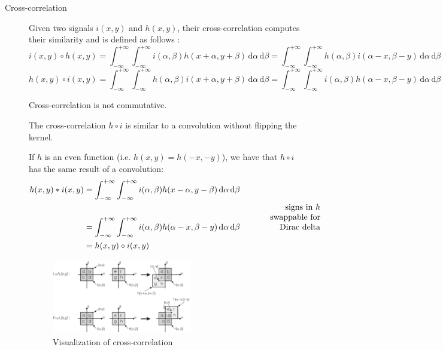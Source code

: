 \begin{description}
    \item[Cross-correlation] 
        Given two signals $i(x, y)$ and $h(x, y)$,
        their cross-correlation computes their similarity and is defined as follows \cite{wiki:crosscorrelation}:
        \[ 
            i(x, y) \circ h(x, y) = 
            \int_{-\infty}^{+\infty}\int_{-\infty}^{+\infty} i(\alpha, \beta) h(x+\alpha, y+\beta) \,\text{d}\alpha\,\text{d}\beta =
            \int_{-\infty}^{+\infty}\int_{-\infty}^{+\infty} h(\alpha, \beta) i(\alpha-x, \beta-y) \,\text{d}\alpha\,\text{d}\beta 
        \]
        \[ 
            h(x, y) \circ i(x, y) = 
            \int_{-\infty}^{+\infty}\int_{-\infty}^{+\infty} h(\alpha, \beta) i(x+\alpha, y+\beta) \,\text{d}\alpha\,\text{d}\beta =
            \int_{-\infty}^{+\infty}\int_{-\infty}^{+\infty} i(\alpha, \beta) h(\alpha-x, \beta-y) \,\text{d}\alpha\,\text{d}\beta 
        \]

        \begin{remark}
            Cross-correlation is not commutative.
        \end{remark}

        \begin{remark}
            The cross-correlation $h \circ i$ is similar to a convolution without flipping the kernel.

            If $h$ is an even function (i.e. $h(x, y) = h(-x, -y)$), we have that $h \circ i$ has the same result of a convolution:
            \begin{align*}
                h(x, y) * i(x, y) &= \int_{-\infty}^{+\infty} \int_{-\infty}^{+\infty} i(\alpha, \beta)h(x-\alpha, y-\beta) \,\text{d}\alpha\,\text{d}\beta \\
                    &= \int_{-\infty}^{+\infty} \int_{-\infty}^{+\infty} i(\alpha, \beta)h(\alpha-x, \beta-y) \,\text{d}\alpha\,\text{d}\beta 
                    & \parbox[b]{0.25\textwidth}{\raggedleft signs in $h$ swappable for Dirac delta} \\
                    &= h(x, y) \circ i(x, y)
            \end{align*}
        \end{remark}

        \begin{figure}[H]
            \centering
            \includegraphics[width=0.6\textwidth]{./img/crosscorrelation_graphical.png}
            \caption{Visualization of cross-correlation}
        \end{figure}
\end{description}


